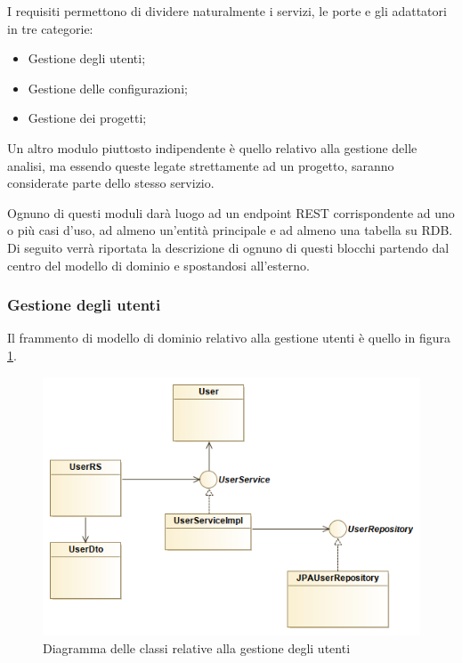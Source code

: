I requisiti permettono di dividere naturalmente i servizi, le porte e gli adattatori in tre categorie:
\begin{itemize}
	\item Gestione degli utenti;
	\item Gestione delle configurazioni;
	\item Gestione dei progetti;
\end{itemize}

Un altro modulo piuttosto indipendente è quello relativo alla gestione delle analisi, ma essendo queste legate strettamente ad un progetto, saranno considerate parte dello stesso servizio.

Ognuno di questi moduli darà luogo ad un endpoint REST corrispondente ad uno o più casi d'uso, ad almeno un'entità principale e ad almeno una tabella su RDB.
Di seguito verrà riportata la descrizione di ognuno di questi blocchi partendo dal centro del modello di dominio e spostandosi all'esterno.

\subsubsection{Gestione degli utenti}
Il frammento di modello di dominio relativo alla gestione utenti è quello in figura \ref{fig:users_diagram}.

\begin{figure}[h]
	\centering
	\includegraphics[width=\textwidth]{img/users_diagram}
	\caption{Diagramma delle classi relative alla gestione degli utenti}
	\label{fig:users_diagram}
\end{figure}

